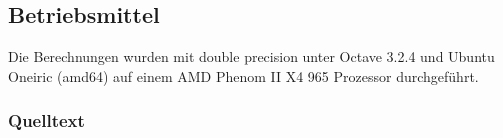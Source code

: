 \documentclass{scrartcl}
\begin{document}
\subsection{Betriebsmittel}

Die Berechnungen wurden mit double precision unter Octave 3.2.4 und Ubuntu
Oneiric (amd64) auf einem AMD Phenom II X4 965 Prozessor durchgeführt.

\subsubsection{Quelltext}













\end{document}
